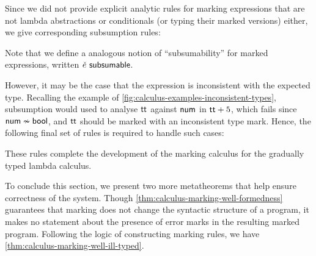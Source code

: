 Since we did not provide explicit analytic rules for marking expressions that are not lambda
abstractions or conditionals (or typing their marked versions) either, we give corresponding
subsumption rules:
%
\begin{mathpar}

\end{mathpar}
%
Note that we define a analogous notion of ``subsumability'' for marked expressions, written
$\subsumable{\ECMV}$.

However, it may be the case that the expression is inconsistent with the expected type. Recalling
the example of \cref{fig:calculus-examples-inconsistent-types}, subsumption would used to analyse
$\ETrue$ against $\TNum$ in $\EPlus{\ETrue}{5}$, which fails since $\inconsistent{\TNum}{\TBool}$,
and $\ETrue$ should be marked with an inconsistent type mark. Hence, the following final set of
rules is required to handle such cases:
%
\begin{mathpar}

\end{mathpar}
%
These rules complete the development of the marking calculus for the gradually typed lambda
calculus.


To conclude this section, we present two more metatheorems that help ensure correctness of the
system. Though \cref{thm:calculus-marking-well-formedness} guarantees that marking does not change
the syntactic structure of a program, it makes no statement about the presence of error marks in the
resulting marked program. Following the logic of constructing marking rules, we have
\cref{thm:calculus-marking-well-ill-typed}.

